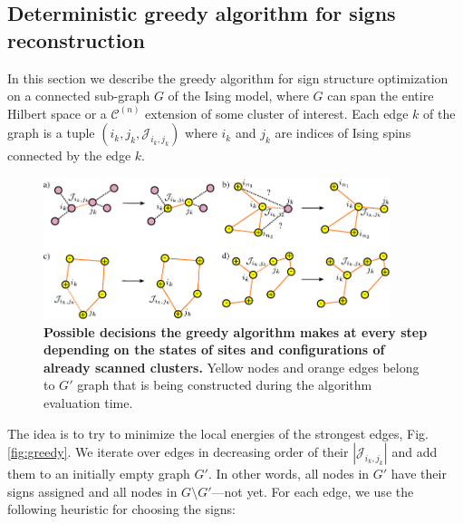 \subsection{Deterministic greedy algorithm for signs reconstruction}

In this section we describe the greedy algorithm for sign structure optimization on a connected sub-graph $G$ of the Ising model, where $G$ can span the entire Hilbert space or a $\mathcal{C}^{(n)}$ extension of some cluster of interest. Each edge $k$ of the graph is a tuple $(i_k, j_k, \mathcal{J}_{i_k, j_k})$ where $i_k$ and $j_k$ are indices of Ising spins connected by the edge $k$.

\begin{figure}
    \centering
    \includegraphics[width=0.9\textwidth]{handmade/greedy_steps_new.pdf}%
    \caption{\textbf{Possible decisions the greedy algorithm makes at every step depending on the states of sites and configurations of already scanned clusters.} Yellow nodes and orange edges belong to $G'$ graph that is being constructed during the algorithm evaluation time.}
    \label{fig:greedy_steps}
\end{figure}
    
The idea is to try to minimize the local energies of the strongest edges, Fig. \ref{fig:greedy}. We iterate over edges in decreasing order of their $|\mathcal{J}_{i_k,j_k}|$ and add them to an initially empty graph $G'$. In other words, all nodes in $G'$ have their signs assigned and all nodes in $G \setminus G'$---not yet. For each edge, we use the following heuristic for choosing the signs:

